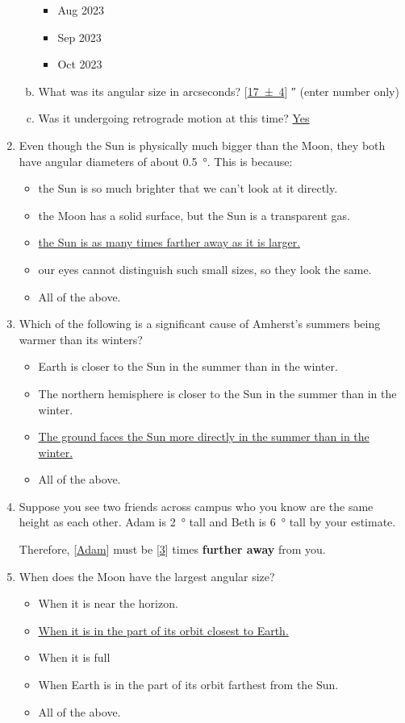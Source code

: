 \documentclass[12pt]{article}
\begin{document}
\begin{enumerate}
\begin{enumerate}[a.]
\begin{itemize}
        \item Aug 2023
        \item Sep 2023
        \item Oct 2023
    \end{itemize}
    \item What was its angular size in arcseconds? [\underline{\num{17(4)}}] \si{\arcsecond} (enter number only)
    \item Was it undergoing retrograde motion at this time? \underline{Yes}
\end{enumerate}
\item
Even though the Sun is physically much bigger than the Moon, they both have angular diameters of about \SI{0.5}{\degree}. This is because:
\begin{itemize}
    \item the Sun is so much brighter that we can’t look at it directly.
    \item the Moon has a solid surface, but the Sun is a transparent gas.
    \item \underline{the Sun is as many times farther away as it is larger.}
    \item our eyes cannot distinguish such small sizes, so they look the same.
    \item All of the above.
\end{itemize}
\item
Which of the following is a significant cause of Amherst’s summers being warmer than its winters?
\begin{itemize}
    \item Earth is closer to the Sun in the summer than in the winter.
    \item The northern hemisphere is closer to the Sun in the summer than in the winter.
    \item \underline{The ground faces the Sun more directly in the summer than in the winter.}
    \item All of the above.
\end{itemize}
\item
Suppose you see two friends across campus who you know are the same height as each other. Adam is \SI{2}{\degree} tall and Beth is \SI{6}{\degree} tall by your estimate.

Therefore, [\underline{Adam}] must be [\underline{3}] times \textbf{further away} from you.
\item
When does the Moon have the largest angular size?
\begin{itemize}
    \item When it is near the horizon.
    \item \underline{When it is in the part of its orbit closest to Earth.}
    \item When it is full
    \item When Earth is in the part of its orbit farthest from the Sun.
    \item All of the above.
\end{itemize}
\end{enumerate}
\end{document}
